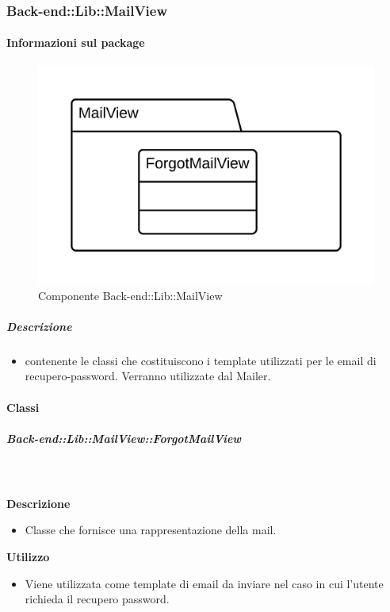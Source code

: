   \subsubsection{Back-end::Lib::MailView}
  \paragraph{Informazioni sul package} 
    \begin{figure}[H] 
      \begin{center} 
        \includegraphics[scale=0.16]{packages/Back-end::Lib::MailView.png}  
        \caption{Componente Back-end::Lib::MailView}
      \end{center}  
    \end{figure} 
  \subparagraph{Descrizione} 
    \begin{itemize}
    \item[]  contenente le classi che costituiscono i template utilizzati per le email di recupero-password. Verranno utilizzate dal  Mailer.
    \end{itemize} 
    \paragraph{Classi}
      \subparagraph{Back-end::Lib::MailView::ForgotMailView}
        
        \textbf{\\ \\ Descrizione} 
          \begin{itemize}
            \item[] Classe che fornisce una rappresentazione della mail.
          \end{itemize}      
        \textbf{Utilizzo}  
          \begin{itemize}
            \item[] Viene utilizzata come template di email da inviare nel caso in cui l'utente richieda il recupero password.
          \end{itemize}
